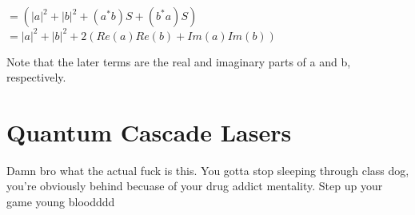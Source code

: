 \documentclass{article}
\begin{document}
$=(|a|^2+|b|^2+(a^*b)S+(b^*a)S)$\\

$=|a|^2+|b|^2+2(Re(a)Re(b)+Im(a)Im(b))$

Note that the later terms are the real and imaginary parts of a and b, respectively.

\section*{Quantum Cascade Lasers}

Damn bro what the actual fuck is this. You gotta stop sleeping through class dog, you're obviously behind becuase of your drug addict mentality. Step up your game young bloodddd\\
\end{document}
